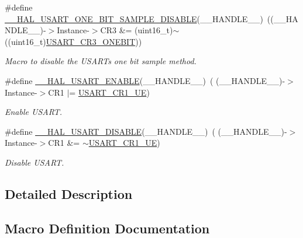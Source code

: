 \begin{DoxyCompactItemize}
\#define \hyperlink{group___u_s_a_r_t___exported___macros_ga78be92ca3073a9029f4696dc2fbb7b71}{\+\_\+\+\_\+\+H\+A\+L\+\_\+\+U\+S\+A\+R\+T\+\_\+\+O\+N\+E\+\_\+\+B\+I\+T\+\_\+\+S\+A\+M\+P\+L\+E\+\_\+\+D\+I\+S\+A\+B\+LE}(\+\_\+\+\_\+\+H\+A\+N\+D\+L\+E\+\_\+\+\_\+)~((\+\_\+\+\_\+\+H\+A\+N\+D\+L\+E\+\_\+\+\_\+)-\/$>$Instance-\/$>$C\+R3 \&= (uint16\+\_\+t)$\sim$((uint16\+\_\+t)\hyperlink{group___peripheral___registers___bits___definition_ga9a96fb1a7beab602cbc8cb0393593826}{U\+S\+A\+R\+T\+\_\+\+C\+R3\+\_\+\+O\+N\+E\+B\+IT}))
\begin{DoxyCompactList}\small\item\em Macro to disable the U\+S\+A\+RT\textquotesingle{}s one bit sample method. \end{DoxyCompactList}\item 
\#define \hyperlink{group___u_s_a_r_t___exported___macros_ga60e106d6d610ea5fa1ab2d5ca079a8cf}{\+\_\+\+\_\+\+H\+A\+L\+\_\+\+U\+S\+A\+R\+T\+\_\+\+E\+N\+A\+B\+LE}(\+\_\+\+\_\+\+H\+A\+N\+D\+L\+E\+\_\+\+\_\+)~( (\+\_\+\+\_\+\+H\+A\+N\+D\+L\+E\+\_\+\+\_\+)-\/$>$Instance-\/$>$C\+R1 $\vert$=  \hyperlink{group___peripheral___registers___bits___definition_ga2bb650676aaae4a5203f372d497d5947}{U\+S\+A\+R\+T\+\_\+\+C\+R1\+\_\+\+UE})
\begin{DoxyCompactList}\small\item\em Enable U\+S\+A\+RT. \end{DoxyCompactList}\item 
\#define \hyperlink{group___u_s_a_r_t___exported___macros_ga8cc760b7a382db42655d21a5edbfc227}{\+\_\+\+\_\+\+H\+A\+L\+\_\+\+U\+S\+A\+R\+T\+\_\+\+D\+I\+S\+A\+B\+LE}(\+\_\+\+\_\+\+H\+A\+N\+D\+L\+E\+\_\+\+\_\+)~( (\+\_\+\+\_\+\+H\+A\+N\+D\+L\+E\+\_\+\+\_\+)-\/$>$Instance-\/$>$C\+R1 \&=  $\sim$\hyperlink{group___peripheral___registers___bits___definition_ga2bb650676aaae4a5203f372d497d5947}{U\+S\+A\+R\+T\+\_\+\+C\+R1\+\_\+\+UE})
\begin{DoxyCompactList}\small\item\em Disable U\+S\+A\+RT. \end{DoxyCompactList}\end{DoxyCompactItemize}


\subsection{Detailed Description}


\subsection{Macro Definition Documentation}
